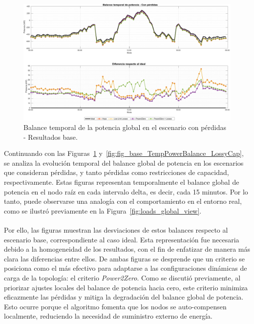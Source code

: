 \begin{figure}[ht!]
    \centering
    \includegraphics[width=\textwidth]{fig/07_bloste/bloste_09.pdf}
    \caption{Balance temporal de la potencia global en el escenario con pérdidas - Resultados base.}
    \label{fig:powerBalance_Lossy}
\end{figure}

Continuando con las Figuras~\ref{fig:powerBalance_Lossy} y~\ref{fig:fig_base_TempPowerBalance_LossyCap}, se analiza la evolución temporal del balance global de potencia en los escenarios que consideran pérdidas, y tanto pérdidas como restricciones de capacidad, respectivamente. Estas figuras representan temporalmente el balance global de potencia en el nodo raíz en cada intervalo delta, es decir, cada 15 minutos. Por lo tanto, puede observarse una analogía con el comportamiento en el entorno real, como se ilustró previamente en la Figura~\ref{fig:loads_global_view}.\\
\\
Por ello, las figuras muestran las desviaciones de estos balances respecto al escenario base, correspondiente al caso ideal. Esta representación fue necesaria debido a la homogeneidad de los resultados, con el fin de enfatizar de manera más clara las diferencias entre ellos. De ambas figuras se desprende que un criterio se posiciona como el más efectivo para adaptarse a las configuraciones dinámicas de carga de la topología: el criterio \textit{Power2Zero}. Como se discutió previamente, al priorizar ajustes locales del balance de potencia hacia cero, este criterio minimiza eficazmente las pérdidas y mitiga la degradación del balance global de potencia. Esto ocurre porque el algoritmo fomenta que los nodos se auto-compensen localmente, reduciendo la necesidad de suministro externo de energía.


